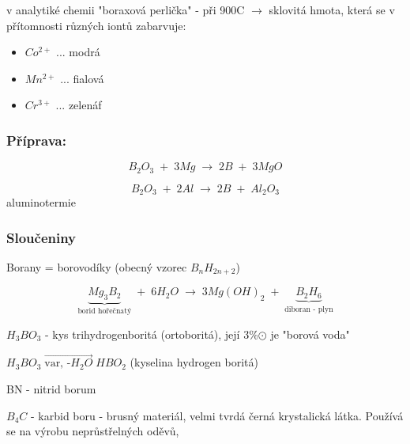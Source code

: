 v analytiké chemii "boraxová perlička" - při 900\˚C $\rightarrow$ sklovitá hmota,
která se v přítomnosti různých iontů zabarvuje:
\begin{itemize}
    \item $Co^{2+}$ ... modrá
    \item $Mn^{2+}$ ... fialová
    \item $Cr^{3+}$ ... zelenáf
\end{itemize}

\subsubsection{Příprava:}
\[B_2O_3 \; + \; 3Mg \; \longrightarrow \; 2B \; + \; 3MgO\]

\[B_2O_3 \; + \; 2Al \; \longrightarrow \; 2B \; + \; Al_2O_3\] aluminotermie

\subsubsection{Sloučeniny}
Borany = borovodíky (obecný vzorec $B_nH_{2n+2}$)

\[\underbrace{Mg_3B_2}_\text{borid hořečnatý} \; + \; 6H_2O \; \longrightarrow \; 3Mg\left(OH\right)_2 \; + \; \underbrace{B_2H_6}_\text{diboran - plyn}\]

$H_3BO_3$ - kys trihydrogenboritá (ortoboritá), její 3\%$\odot$ je "borová voda"

$H_3BO_3 \; \overrightarrow{\text{var, -$H_2O$}} \; HBO_2$ (kyselina hydrogen boritá)

BN - nitrid borum

$B_4C$ - karbid boru - brusný materiál, velmi tvrdá černá krystalická látka.
Používá se na výrobu neprůstřelných oděvů, 